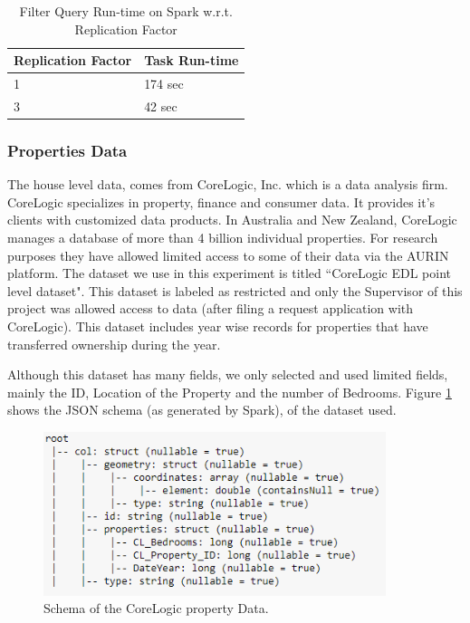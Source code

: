 \documentclass[12pt]{report}
\theoremstyle{named}
\begin{document}
\begin{table}[ht]
\centering
\begin{tabular}{@{}ll@{}}
\toprule
\multicolumn{1}{c}{\textbf{Replication Factor}} & \multicolumn{1}{c}{\textbf{Task Run-time}} \\ \midrule
1 & 174 sec \\
3 & 42 sec \\ \bottomrule
\end{tabular}
\caption{Filter Query Run-time on Spark w.r.t. Replication Factor}
\label{tab:SparkRuntime}
\end{table}
\subsubsection{Properties Data}
The house level data, comes from CoreLogic\cite{CoreLogic}, Inc. which is a data analysis firm. CoreLogic specializes in property, finance and consumer data. It provides it's clients with customized data products. In Australia and New Zealand, CoreLogic manages a database of more than 4 billion individual properties. For research purposes they have allowed limited access to some of their data via the AURIN platform. The dataset we use in this experiment is titled ``CoreLogic EDL point level dataset". This dataset is labeled as restricted and only the Supervisor of this project was allowed access to data (after filing a request application with CoreLogic). This dataset includes year wise records for properties that have transferred ownership during the year. 

Although this dataset has many fields, we only selected and used limited fields, mainly the ID, Location of the Property and the number of Bedrooms. Figure \ref{fig:CoreLogicSchema} shows the JSON schema (as generated by Spark), of the dataset used.


\begin{figure}[ht]
\centering
        \includegraphics[width=100mm,scale=1]{Images/CoreLogicSchema.PNG}
    \caption{Schema of the CoreLogic property Data.}
    \label{fig:CoreLogicSchema}
\end{figure}
\end{document}
